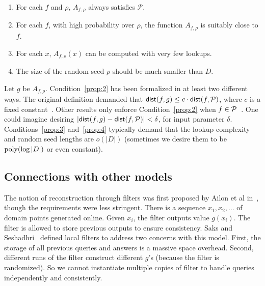 \documentclass[natbib]{svcyclop}
\def\dist{{\sf dist}}
\begin{document}
\begin{enumerate}
\item \label{prop:1} For each $f$ and $\rho$,  $A_{f,\rho}$ 
always satisfies $\mathcal{P}$. 
\item \label{prop:2} For each $f$, with high probability over $\rho$, the function $A_{f,\rho}$ is suitably
close to $f$.
\item \label{prop:3} For each $x$, $A_{f,\rho}(x)$ can be computed with very few lookups.
\item \label{prop:4} The size of the random seed $\rho$ should be much smaller than $D$.
\end{enumerate}

Let $g$ be $A_{f,\rho}$. Condition~\ref{prop:2} has been formalized in at least two different ways. The original definition demanded that $\dist(f,g) \leq c\cdot \dist(f,\cP)$,
where $c$ is a fixed constant~\cite{SS06}. Other results only enforce Condition~\ref{prop:2} when
$f \in \mathcal{P}$~\cite{JhRa13,AwJh+12}. One could imagine desiring $|\dist(f,g) - \dist(f,\cP)| < \delta$,
for input parameter $\delta$.
%
Conditions~\ref{prop:3} and~\ref{prop:4} typically demand that the lookup complexity and random
seed lengths are $o(|D|)$ (sometimes we desire them to be $\mathrm{poly}(\log |D|)$ or even constant). 


%
%


\subsection{Connections with other models}


The notion of reconstruction through filters was first proposed by Ailon et al in~\cite{ACCL2},
though the requirements were less stringent. There is a sequence $x_1, x_2, \ldots$ of domain points generated
online. Given $x_i$, the filter outputs value $g(x_i)$. 
The filter is allowed to store previous outputs to ensure consistency. 
Saks and Seshadhri~\cite{SS06} defined local filters to address two concerns with this model.
First, the storage of all previous queries and answers is a massive space overhead. Second,
different runs of the filter construct different $g$'s (because the filter is randomized).
So we cannot instantiate multiple copies of filter to handle queries independently and consistently.
\end{document}

